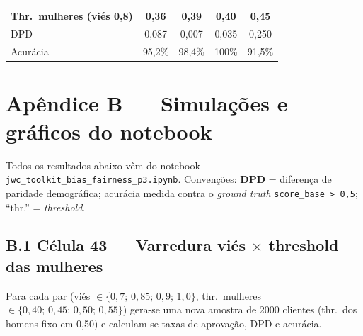 \documentclass[10pt,a4paper]{article}
\begin{document}
\begin{center}
\small
\begin{tabular}{@{}lcccc@{}}
\toprule
Thr.\ mulheres (vi\'es 0,8) & 0,36 & 0,39 & 0,40 & 0,45 \\ \midrule
DPD & 0,087 & 0,007 & 0,035 & 0,250 \\
Acur\'acia & 95,2\% & 98,4\% & 100\% & 91,5\% \\ \bottomrule
\end{tabular}
\end{center}
\newpage
\section*{Ap\^endice B --- Simula\c{c}\~oes e gr\'aficos do notebook}
Todos os resultados abaixo v\^em do notebook \texttt{jwc\_toolkit\_bias\_fairness\_p3.ipynb}. Convenções: \textbf{DPD} = diferen\c{c}a de paridade demogr\'afica; acur\'acia medida contra o \textit{ground truth} \texttt{score\_base > 0,5}; ``thr.'' = \textit{threshold}.

\subsection*{B.1 C\'elula 43 --- Varredura vi\'es $\times$ threshold das mulheres}
Para cada par (vi\'es $\in\{0{,}7;\,0{,}85;\,0{,}9;\,1{,}0\}$, thr.\ mulheres $\in\{0{,}40;\,0{,}45;\,0{,}50;\,0{,}55\}$) gera-se uma nova amostra de 2000 clientes (thr.\ dos homens fixo em 0,50) e calculam-se taxas de aprova\c{c}\~ao, DPD e acur\'acia.
\end{document}
